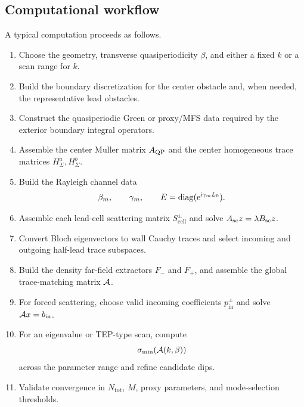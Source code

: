 \subsection{Computational workflow}

A typical computation proceeds as follows.
\begin{enumerate}
  \item Choose the geometry, transverse quasiperiodicity \(\beta\), and either a
  fixed \(k\) or a scan range for \(k\).
  \item Build the boundary discretization for the center obstacle and, when
  needed, the representative lead obstacles.
  \item Construct the quasiperiodic Green or proxy/MFS data required by the
  exterior boundary integral operators.
  \item Assemble the center Muller matrix \(A_{\mathrm{QP}}\) and the center homogeneous
  trace matrices \(H_\Sigma^a,H_\Sigma^b\).
  \item Build the Rayleigh channel data
  \[
    \beta_m,\qquad \gamma_m,\qquad E=\operatorname{diag}(\mathrm{e}^{\mathrm{i}\gamma_mL_0}).
  \]
  \item Assemble each lead-cell scattering matrix \(S_{\mathrm{cell}}^\pm\) and
  solve \(A_{\mathrm{sc}} z=\lambda B_{\mathrm{sc}} z\).
  \item Convert Bloch eigenvectors to wall Cauchy traces and select incoming and
  outgoing half-lead trace subspaces.
  \item Build the density far-field extractors \(F_-\) and \(F_+\), and assemble
  the global trace-matching matrix \(\mathcal A\).
  \item For forced scattering, choose valid incoming coefficients
  \(p_{\mathrm{in}}^\pm\) and solve \(\mathcal A x=b_{\mathrm{in}}\).
  \item For an eigenvalue or TEP-type scan, compute
  \[
    \sigma_{\min}(\mathcal A(k,\beta))
  \]
  across the parameter range and refine candidate dips.
  \item Validate convergence in \(N_{\mathrm{tot}}\), \(M\), proxy parameters,
  and mode-selection thresholds.
\end{enumerate}
